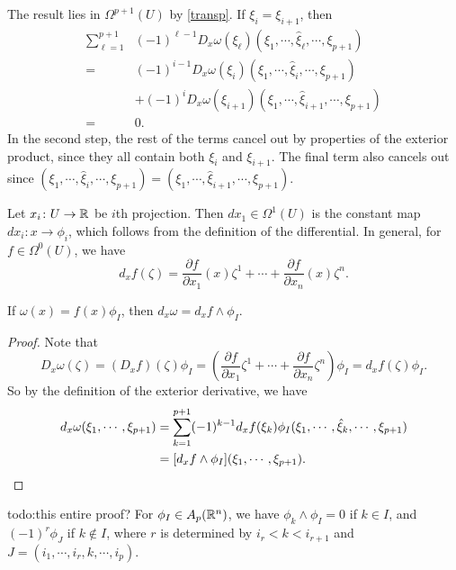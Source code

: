 The result lies in $\Omega^{p+1}(U)$ by \cref{transp}. If $\xi_i =\xi_{i+1}$, then 
\begin{align*}
    \sum_{\ell=1}^{p+1} &(-1)^{\ell -1}D_x\omega(\xi_{\ell})(\xi_1,\cdots ,\hat{\xi}_{\ell},\cdots ,\xi_{p+1})\\
    =&(-1)^{i-1}D_x\omega(\xi_i )(\xi_1,\cdots ,\hat{\xi}_i ,\cdots ,\xi_{p+1})\\
     &+(-1)^i D_x\omega(\xi_{i+1})(\xi_1,\cdots ,\hat{\xi}_{i+1},\cdots ,\xi_{p+1})\\
    =&0.
\end{align*}
In the second step, the rest of the terms cancel out by properties of the exterior product, since they all contain both $\xi_i $ and $\xi_{i+1}$. The final term also cancels out since $(\xi_1,\cdots ,\hat{\xi}_i ,\cdots ,\xi_{p+1})=(\xi_1,\cdots ,\hat{\xi}_{i+1},\cdots ,\xi_{p+1})$.

\begin{example}
    Let $x_i  \colon U \to \mathbb{R}$ be $i$th projection. Then $dx_1 \in \Omega^1(U)$ is the constant map $dx_i \colon x \to \phi_i $, which follows from the definition of the differential. In general, for $f \in \Omega^0(U)$, we have \[
        d_x f(\zeta)= \frac{\partial f}{\partial x_1}(x)\zeta^1+\cdots + \frac{\partial f}{\partial x_n }(x)\zeta ^n .
    \] 
\end{example}

\begin{lemma}
    If $\omega(x)=f(x)\phi_I$, then $d_x\omega=d_x f \wedge \phi_I$.
\end{lemma}
\begin{proof}
    Note that \[
        D_x\omega(\zeta)=(D_x f)(\zeta)\phi_I =\left( \frac{\partial f}{\partial x_1}\zeta^1+\cdots + \frac{\partial f}{\partial x_n }\zeta^n  \right) \phi_I=d_xf (\zeta) \phi_I.
    \] So by the definition of the exterior derivative, we have 
    \begin{align*}
        d_x\omega(\xi_1,\cdots ,\xi_{p+1})&=\sum_{k=1}^{p+1} (-1)^{k-1}d_x f(\xi_k) \phi_I (\xi_1,\cdots ,\hat{\xi}_k,\cdots ,\xi_{p+1})\\
        &= [d_x f \wedge \phi_I](\xi_1,\cdots ,\xi_{p+1}).\qedhere
    \end{align*}
\end{proof}
{\color{red}todo:this entire proof?} For $\phi_I \in A_p(\mathbb{R}^n )$, we have $\phi_k \wedge \phi_I=0$ if $k \in I$, and $(-1)^r \phi_J$ if $k\notin I$, where $r$ is determined by $i_r < k < i_{r+1}$ and $J=(i_1,\cdots ,i_r,k,\cdots ,i_p)$.

